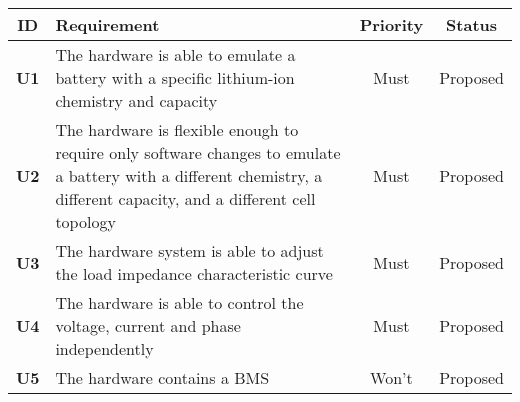 \begin{longtable}{|c|p{10cm}|c|c|}
    \hline
    \textbf{ID} & \textbf{Requirement} & \textbf{Priority} & \textbf{Status}\\ \hline 
    \textbf{U1} & The hardware is able to emulate a battery with a specific lithium-ion chemistry and capacity & Must & Proposed\\ \hline
    \textbf{U2} & The hardware is flexible enough to require only software changes to emulate a battery with a different chemistry, a different capacity, and a different cell topology & Must & Proposed\\ \hline
    \textbf{U3} & The hardware system is able to adjust the load impedance characteristic curve & Must & Proposed\\ \hline
    \textbf{U4} & The hardware is able to control the voltage, current and phase independently & Must & Proposed\\ \hline
    \textbf{U5} & The hardware contains a BMS & Won't & Proposed\\ \hline
\end{longtable}


